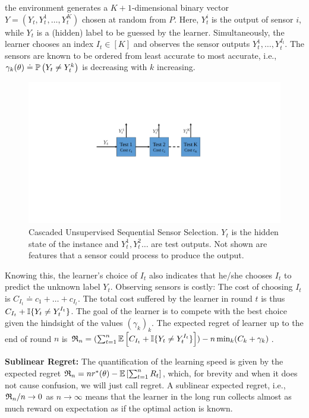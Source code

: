 the environment generates a $K+1$-dimensional binary vector
$Y = (Y_t,Y_t^1,\dots,Y_t^K)$ chosen at random from $P$.
Here, $Y_t^i$ is the output of sensor $i$, while $Y_t$ is a (hidden) label to be guessed by the learner.
Simultaneously, the learner chooses an index $I_t\in [K]$ and observes the sensor outputs $Y_t^1,\dots,Y_t^{I_t}$.
The sensors are known to be ordered from least accurate to most accurate, 
i.e., $\gamma_k(\theta) \doteq \mathbb{P}\left(Y_t\ne Y_t^k\right)$ is decreasing with $k$ increasing.
\begin{figure}[!h]
	\centering
	\includegraphics[scale=.4]{../Figures/Cascade.pdf}
	\caption{\footnotesize Cascaded Unsupervised Sequential Sensor Selection. $Y_t$ is the hidden state of the instance and $Y_t^1, Y_t^2 \ldots$ are test outputs. Not shown are features that a sensor could process to produce the output.}
	\label{fig:SensorCascade}
	\vspace{-.2cm}
\end{figure} 
Knowing this, the learner's choice of $I_t$ also indicates that he/she chooses $I_t$ to predict the unknown label $Y_t$.
Observing sensors is costly: The cost of choosing $I_t$ is $C_{I_t} \doteq c_1 + \dots + c_{I_t}$.
The total cost suffered by the learner in round $t$ is thus $C_{I_t} + \mathbb{I}\{Y_t \ne Y_t^{I_t}\}$.
The goal of the learner is to compete with the best choice given the hindsight of the values $(\gamma_k)_k$.
The expected regret of learner up to the end of round $n$ is 
$\mathfrak{R}_n =( \sum_{t=1}^n \mathbb{E}\left[ C_{I_t} +\mathbb{I}\{Y_t \ne Y_t^{I_t} \}\right] )- n \min_k (C_k + \gamma_k)$.

\noindent
{\bf Sublinear Regret:} The quantification of the learning speed is given by the expected regret 
$\mathfrak{R}_n = n r^*(\theta) - \mathbb{E}\left[\sum_{t=1}^n R_t\right]$, which, for brevity and when it does not cause confusion, 
we will just call regret. A sublinear expected regret, i.e., $\mathfrak{R}_n/n \to 0$ as $n\to \infty$ means that the learner in the long run collects almost as much reward on expectation as if the optimal action is known.

